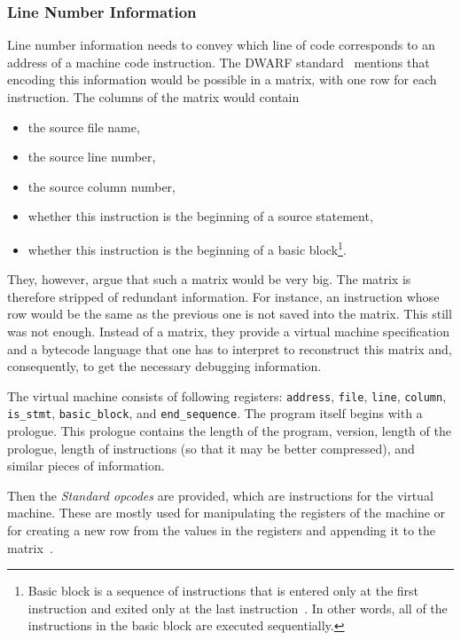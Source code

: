 \subsubsection{Line Number Information}\label{section:line-number-information}
Line number information needs to convey which line of code corresponds to an
address of a machine code instruction. The DWARF standard~\cite{dwarf} mentions
that encoding this information would be possible in a matrix, with one row for
each instruction. The columns of the matrix would contain
\begin{itemize}
    \item the source file name,
    \item the source line number,
    \item the source column number,
    \item whether this instruction is the beginning of a source statement,
    \item whether this instruction is the beginning of a basic
        block\footnote{Basic block is a sequence of instructions that is
        entered only at the first instruction and exited only at the last
        instruction~\cite{dwarf}. In other words, all of the instructions in
        the basic block are executed sequentially.}.
\end{itemize}
They, however, argue that such a matrix would be very big. The matrix is
therefore stripped of redundant information. For instance, an instruction whose
row would be the same as the previous one is not saved into the matrix. This
still was not enough. Instead of a matrix, they provide a virtual machine
specification and a bytecode language that one has to interpret to reconstruct
this matrix and, consequently, to get the necessary debugging information.

The virtual machine consists of following registers: \texttt{address},
\texttt{file}, \texttt{line}, \texttt{column}, \texttt{is\_stmt},
\texttt{basic\_block}, and \texttt{end\_sequence}. The program itself begins
with a prologue. This prologue contains the length of the program, version,
length of the prologue, length of instructions (so that it may be better
compressed), and similar pieces of information. 

Then the \textit{Standard opcodes} are provided, which are instructions for the
virtual machine. These are mostly used for manipulating the registers of the
machine or for creating a new row from the values in the registers and
appending it to the matrix~\cite{dwarf}. 

